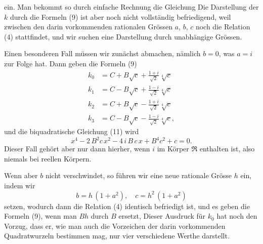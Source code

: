 
ein. Man bekommt so durch einfache Rechnung die Gleichung
Die Darstellung der $k$ durch die Formeln (9) ist aber noch nicht vollst\"andig befriedigend, weil zwischen den darin vorkommenden rationalen Gr\"ossen $a$, $b$, $c$ noch die Relation (4) stattfindet, und wir suchen eine Darstellung durch unabh\"angige Gr\"ossen.

Einen besonderen Fall m\"ussen wir zun\"achst abmachen, n\"amlich $b = 0$, was $a = i$ zur Folge hat. Dann geben die Formeln (9)
\[
\begin{aligned}
k_0 &= C + B\sqrt{c} + \frac{1+i}{\sqrt{2}}\sqrt[4]{c}\\
k_1 &= C - B\sqrt{c} + \frac{1-i}{\sqrt{2}}\sqrt[4]{c}\\
k_2 &= C + B\sqrt{c} - \frac{1+i}{\sqrt{2}}\sqrt[4]{c}\\
k_3 &= C - B\sqrt{c} - \frac{1-i}{\sqrt{2}}\sqrt[4]{c},
\end{aligned}
\]
und die biquadratische Gleichung (11) wird
\[
x^4 - 2\,B^2c\,x^2 - 4\,i\,B\,c\,x + B^4c^2 + c = 0.
\]
Dieser Fall geh\"ort aber nur dann hierher, wenn $i$ im K\"orper $\mathfrak{R}$ enthalten ist, also niemals bei reellen K\"orpern.

Wenn aber $b$ nicht verschwindet, so f\"uhren wir eine neue rationale Gr\"osse $h$ ein, indem wir
\[
b = h\,(1 + a^2), \quad c = h^2\,(1 + a^2)
\]
setzen, wodurch dann die Relation (4) identisch befriedigt ist, und es geben die Formeln (9), wenn man $Bh$ durch $B$ ersetzt,
Dieser Ausdruck f\"ur $k_0$ hat noch den Vorzug, dass er, wie man auch die Vorzeichen der darin vorkommenden Quadratwurzeln bestimmen mag, nur vier verschiedene Werthe darstellt.
